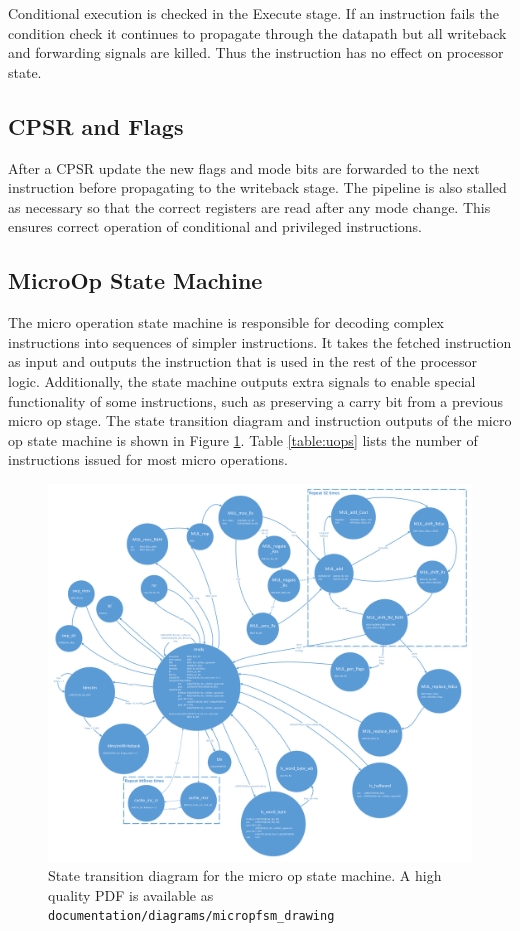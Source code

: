 Conditional execution is checked in the Execute stage.
If an instruction fails the condition check it continues to propagate through the datapath but all writeback and forwarding signals are killed. 
Thus the instruction has no effect on processor state.

\subsection{CPSR and Flags}
After a CPSR update the new flags and mode bits are forwarded to the next instruction before propagating to the writeback stage. 
The pipeline is also stalled as necessary so that the correct registers are read after any mode change.
This ensures correct operation of conditional and privileged instructions.

\subsection{MicroOp State Machine}\label{sec:uop}

The micro operation state machine is responsible for decoding complex instructions into sequences of simpler instructions. 
It takes the fetched instruction as input and outputs the instruction that is used in the rest of the processor logic. 
Additionally, the state machine outputs extra signals to enable special functionality of some instructions, such as preserving a carry bit from a previous micro op stage. 
The state transition diagram and instruction outputs of the micro op state machine is shown in Figure \ref{fig:uopdiagram}.
Table \ref{table:uops} lists the number of instructions issued for most micro operations.

\begin{figure}[h!]
\centering
\includegraphics[width=\textwidth]{./diagrams/micropfsm_drawing.pdf}
\caption{State transition diagram for the micro op state machine. A high quality PDF is available as \texttt{documentation/diagrams/micropfsm\_drawing}}
\label{fig:uopdiagram}
\end{figure}

